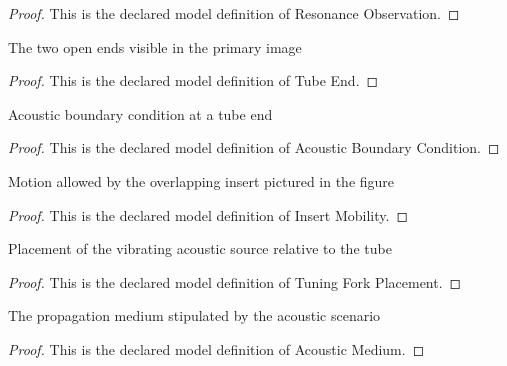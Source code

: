 \begin{proof}
  This is the declared model definition of Resonance Observation.
\end{proof}
\begin{definition}
  \label{def:physics:phyx-mini-0184:phyxminiproblems-problemphyxmini0184-tubeend}
  The two open ends visible in the primary image
\end{definition}
\begin{proof}
  This is the declared model definition of Tube End.
\end{proof}
\begin{definition}
  \label{def:physics:phyx-mini-0184:phyxminiproblems-problemphyxmini0184-acousticboundarycondition}
  Acoustic boundary condition at a tube end
\end{definition}
\begin{proof}
  This is the declared model definition of Acoustic Boundary Condition.
\end{proof}
\begin{definition}
  \label{def:physics:phyx-mini-0184:phyxminiproblems-problemphyxmini0184-insertmobility}
  Motion allowed by the overlapping insert pictured in the figure
\end{definition}
\begin{proof}
  This is the declared model definition of Insert Mobility.
\end{proof}
\begin{definition}
  \label{def:physics:phyx-mini-0184:phyxminiproblems-problemphyxmini0184-tuningforkplacement}
  Placement of the vibrating acoustic source relative to the tube
\end{definition}
\begin{proof}
  This is the declared model definition of Tuning Fork Placement.
\end{proof}
\begin{definition}
  \label{def:physics:phyx-mini-0184:phyxminiproblems-problemphyxmini0184-acousticmedium}
  The propagation medium stipulated by the acoustic scenario
\end{definition}
\begin{proof}
  This is the declared model definition of Acoustic Medium.
\end{proof}
